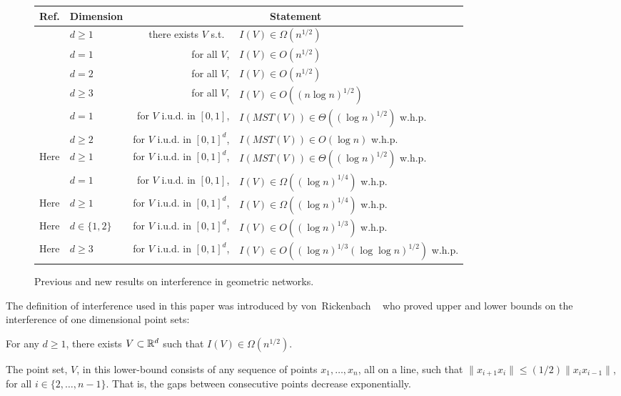 \documentclass{cccg12}
\newcommand{\mst}{\mathit{MST}}
\begin{document}
\begin{figure*}
\begin{center}
  \begin{tabular}{|l|l|r@{ }l|}\hline
    Ref. & Dimension & \multicolumn{2}{c|}{Statement} \\ \hline
    \cite{vR05} & $d\ge 1$ & there exists $V$ s.t.\ & $I(V)\in \Omega(n^{1/2})$ \\
    \cite{vR05} & $d=1$ & for all $V$, & $I(V)\in O(n^{1/2})$ \\
    \cite{ht08} & $d=2$ & for all $V$, & $I(V)\in O(n^{1/2})$ \\
    \cite{ht08} & $d\ge 3$ & for all $V$, & $I(V)\in O((n\log n)^{1/2})$ \\
    \cite{kkmns10} & $d= 1$ & for $V$ i.u.d. in $[0,1]$, & $I(\mst(V))\in \Theta((\log n)^{1/2})$ w.h.p. \\
    \cite{kdh11} & $d\ge 2$ & for $V$ i.u.d. in $[0,1]^d$, & $I(\mst(V))\in O(\log n)$ w.h.p.  \\
    Here & $d\ge 1$ & for $V$ i.u.d. in $[0,1]^d$, & $I(\mst(V))\in \Theta((\log n)^{1/2})$ w.h.p.  \\ 
    \cite{kkmns10,vR05} & $d = 1$ & for $V$ i.u.d. in $[0,1]$, & $I(V)\in\Omega((\log n)^{1/4})$ w.h.p.  \\
    Here & $d\ge 1$ & for $V$ i.u.d. in $[0,1]^d$,  & $I(V)\in \Omega((\log n)^{1/4})$ w.h.p.  \\ 
    Here & $d\in\{1,2\}$ & for $V$ i.u.d. in $[0,1]^d$, & $I(V)\in O((\log n)^{1/3})$ w.h.p.  \\
    Here & $d\ge 3$ & for $V$ i.u.d. in $[0,1]^d$, & $I(V)\in O((\log n)^{1/3}(\log\log n)^{1/2})$ w.h.p.  \\
  \hline
  \end{tabular}
\end{center}
\caption{Previous and new results on interference in geometric networks.}
\end{figure*}

The definition of interference used in this paper was introduced by
von~Rickenbach \etal\ \cite{vR05} who proved upper and
lower bounds on the interference of one dimensional point sets:
\begin{thm}
For any $d\ge 1$, there exists $V\subset\mathbb{R}^{d}$ such
that $I(V)\in\Omega(n^{1/2})$.
\end{thm}
The point set, $V$, in this lower-bound consists of any sequence of
points $x_1,\ldots,x_n$, all on a line, such that $\|x_{i+1}x_i\| \le (1/2)\|x_{i}x_{i-1}\|$,
for all $i\in\{2,\ldots,n-1\}$.  That is, the gaps between consecutive
points decrease exponentially.
\end{document}
